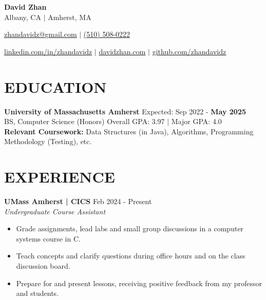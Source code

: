 \documentclass[letterpaper,10pt]{extarticle}
\begin{document}
\pagestyle{empty}

\begin{center}
\textbf{\Large David Zhan}\\[2pt] %
Albany, CA $|$ Amherst, MA

\href{mailto:zhandavidz@gmail.com}{zhandavidz@gmail.com} $|$ \href{tel:5105080222}{(510) 508-0222}

\href{https://www.linkedin.com/in/zhandavidz}{linkedin.com/in/zhandavidz} $|$ \href{https://davidzhan.com}{davidzhan.com} $|$ \href{https://github.com/zhandavidz}{github.com/zhandavidz}
\end{center}

\section*{EDUCATION}
\noindent
\textbf{University of Massachusetts Amherst} \hfill Expected: Sep 2022 - \textbf{May 2025}\\ %
BS, Computer Science (Honors) \hfill Overall GPA: 3.97 $|$ Major GPA: 4.0\\ %

\noindent
\textbf{Relevant Coursework:} Data Structures (in Java), Algorithms, Programming Methodology (Testing), etc.


\section*{EXPERIENCE}

\noindent
\textbf{UMass Amherst | CICS} \hfill Feb 2024 - Present \\ %
\textit{Undergraduate Course Assistant} %
\begin{itemize}
    \item Grade assignments, lead labs and small group discussions in a computer systems course in C.
    \item Teach concepts and clarify questions during office hours and on the class discussion board.
    \item Prepare for and present lessons, receiving positive feedback from my professor and students.
\end{itemize}
\end{document}
